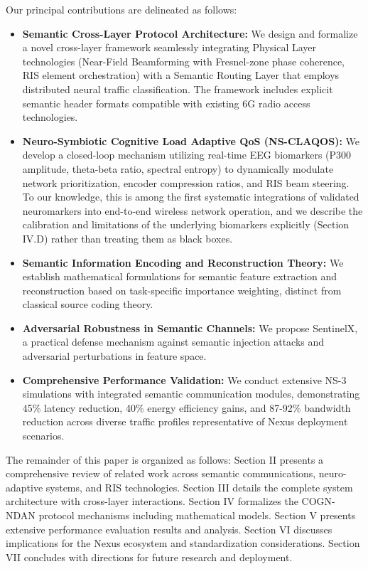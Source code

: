 \documentclass[journal]{IEEEtran}
\newcommand{\COGN}{COGN-NDAN}
\begin{document}
Our principal contributions are delineated as follows:
\begin{itemize}
    \item \textbf{Semantic Cross-Layer Protocol Architecture:} We design and formalize a novel cross-layer framework seamlessly integrating Physical Layer technologies (Near-Field Beamforming with Fresnel-zone phase coherence, RIS element orchestration) with a Semantic Routing Layer that employs distributed neural traffic classification. The framework includes explicit semantic header formats compatible with existing 6G radio access technologies.
    \item \textbf{Neuro-Symbiotic Cognitive Load Adaptive QoS (NS-CLAQOS):} We develop a closed-loop mechanism utilizing real-time EEG biomarkers (P300 amplitude, theta-beta ratio, spectral entropy) to dynamically modulate network prioritization, encoder compression ratios, and RIS beam steering. To our knowledge, this is among the first systematic integrations of validated neuromarkers into end-to-end wireless network operation, and we describe the calibration and limitations of the underlying biomarkers explicitly (Section IV.D) rather than treating them as black boxes.
    \item \textbf{Semantic Information Encoding and Reconstruction Theory:} We establish mathematical formulations for semantic feature extraction and reconstruction based on task-specific importance weighting, distinct from classical source coding theory.
    \item \textbf{Adversarial Robustness in Semantic Channels:} We propose SentinelX, a practical defense mechanism against semantic injection attacks and adversarial perturbations in feature space.
    \item \textbf{Comprehensive Performance Validation:} We conduct extensive NS-3 simulations with integrated semantic communication modules, demonstrating 45\% latency reduction, 40\% energy efficiency gains, and 87-92\% bandwidth reduction across diverse traffic profiles representative of Nexus deployment scenarios.
\end{itemize}

The remainder of this paper is organized as follows: Section II presents a comprehensive review of related work across semantic communications, neuro-adaptive systems, and RIS technologies. Section III details the complete system architecture with cross-layer interactions. Section IV formalizes the \COGN{} protocol mechanisms including mathematical models. Section V presents extensive performance evaluation results and analysis. Section VI discusses implications for the Nexus ecosystem and standardization considerations. Section VII concludes with directions for future research and deployment.
\end{document}
